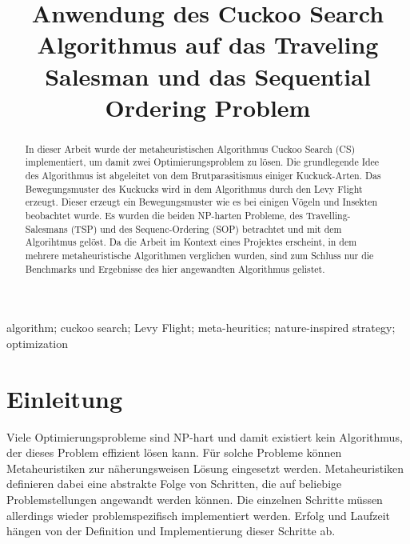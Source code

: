 \documentclass[conference]{IEEEtran}
\begin{document}
  \title{Anwendung des Cuckoo Search Algorithmus auf das Traveling Salesman und das Sequential Ordering Problem}

  \author{
    \and
  }

  \maketitle

  \begin{abstract}
    In dieser Arbeit wurde der metaheuristischen Algorithmus Cuckoo Search (CS) implementiert, um damit zwei Optimierungsproblem zu lösen. 
    Die grundlegende Idee des Algorithmus ist abgeleitet von dem Brutparasitismus einiger Kuckuck-Arten. Das Bewegungsmuster des Kuckucks 
    wird in dem Algorithmus durch den Levy Flight erzeugt. Dieser erzeugt ein Bewegungsmuster wie es bei einigen Vögeln und Insekten 
    beobachtet wurde.  Es wurden die beiden NP-harten Probleme, des Travelling-Salesmans (TSP) und des Sequenc-Ordering (SOP) betrachtet 
    und mit dem Algorihtmus gelöst. Da die Arbeit im Kontext eines Projektes erscheint, in dem mehrere metaheuristische Algorithmen verglichen 
    wurden, sind zum Schluss nur die Benchmarks und Ergebnisse des hier angewandten Algorithmus gelistet.
  \end{abstract}

  \begin{IEEEkeywords}
    algorithm; cuckoo search; Levy Flight; meta-heuritics; nature-inspired strategy; optimization
  \end{IEEEkeywords}

  \section{Einleitung}
    Viele Optimierungsprobleme sind NP-hart und damit existiert kein Algorithmus, der dieses Problem effizient lösen kann. Für solche 
    Probleme können Metaheuristiken zur näherungsweisen Lösung eingesetzt werden. Metaheuristiken definieren dabei eine abstrakte Folge 
    von Schritten, die auf beliebige Problemstellungen angewandt werden können. Die einzelnen Schritte müssen allerdings wieder 
    problemspezifisch implementiert werden. Erfolg und Laufzeit hängen von der Definition und Implementierung dieser Schritte ab. 
\end{document}
